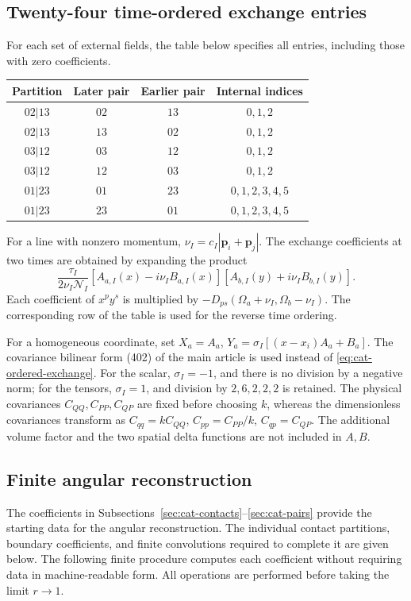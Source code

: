 \documentclass[11pt,a4paper]{article}
\begin{document}
\subsection{Twenty-four time-ordered exchange entries}
\label{sec:cat-exchanges}
For each set of external fields, the table below specifies all entries, including those with zero coefficients.
\begin{longtable}{cccc}
Partition & Later pair & Earlier pair & Internal indices\\\hline
$02|13$ & $02$ & $13$ & $0,1,2$\\
$02|13$ & $13$ & $02$ & $0,1,2$\\
$03|12$ & $03$ & $12$ & $0,1,2$\\
$03|12$ & $12$ & $03$ & $0,1,2$\\
$01|23$ & $01$ & $23$ & $0,1,2,3,4,5$\\
$01|23$ & $23$ & $01$ & $0,1,2,3,4,5$\\
\end{longtable}
For a line with nonzero momentum, $\nu_I=c_I|\mathbf p_i+\mathbf p_j|$. The exchange coefficients at two times are obtained by expanding the product
\begin{equation}
 \frac{\tau_I}{2\nu_I\mathcal N_I}
 [A_{a,I}(x)-i\nu_I B_{a,I}(x)]
 [A_{b,I}(y)+i\nu_I B_{b,I}(y)].
\label{eq:cat-ordered-exchange}
\end{equation}
Each coefficient of $x^py^s$ is multiplied by $-D_{ps}(\Omega_a+\nu_I,\Omega_b-\nu_I)$. The corresponding row of the table is used for the reverse time ordering.

For a homogeneous coordinate, set $X_a=A_a$, $Y_a=\sigma_I[(x-x_i)A_a+B_a]$. The covariance bilinear form (402) of the main article is used instead of \eqref{eq:cat-ordered-exchange}.
For the scalar, $\sigma_I=-1$, and there is no division by a negative norm; for the tensors, $\sigma_I=1$, and division by $2,6,2,2,2$ is retained. The physical covariances $C_{QQ},C_{PP},C_{QP}$ are fixed before choosing $k$, whereas the dimensionless covariances transform as $C_{qq}=kC_{QQ}$, $C_{pp}=C_{PP}/k$, $C_{qp}=C_{QP}$. The additional volume factor and the two spatial delta functions are not included in $A,B$.
\subsection{Finite angular reconstruction}
\label{sec:cat-angular}
The coefficients in Subsections~\ref{sec:cat-contacts}--\ref{sec:cat-pairs} provide the starting data for the angular reconstruction. The individual contact partitions, boundary coefficients, and finite convolutions required to complete it are given below. The following finite procedure computes each coefficient without requiring data in machine-readable form. All operations are performed before taking the limit $r\to1$.
\end{document}
